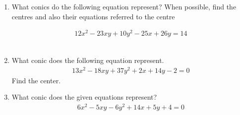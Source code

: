\renewcommand{\theequation}{\theenumi}
\renewcommand{\thefigure}{\theenumi}
\begin{enumerate}[label=\thesection.\arabic*.,ref=\thesection.\theenumi]
%
\item What conics do the following equation represent? When possible, find the centres and also their equations referred to the centre

\begin{align}
12x^2-23xy+10y^2-25x+26y=14\label{eq:solutions/40/1/ques}
\end{align}
\\
\solution

\item What conic does the following equation represent. 
\begin{align}
13x^2-18xy+37y^2+2x+14y-2 = 0
\end{align}
Find the center.
\\
\solution

%
\item What conic does the given equations represent?
\begin{align}
6x^2-5xy-6y^2+14x+5y+4=0
\end{align}
\\
\solution

\end{enumerate}



